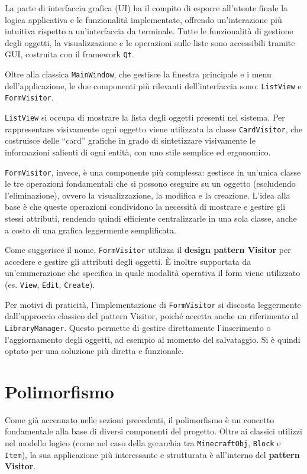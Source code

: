 \documentclass[12pt]{article}
\begin{document}
La parte di interfaccia grafica (UI) ha il compito di esporre all’utente finale la logica applicativa e le funzionalità implementate, offrendo un’interazione più intuitiva rispetto a un’interfaccia da terminale.  
Tutte le funzionalità di gestione degli oggetti, la visualizzazione e le operazioni sulle liste sono accessibili tramite GUI, costruita con il framework \texttt{Qt}.

Oltre alla classica \texttt{MainWindow}, che gestisce la finestra principale e i menu dell'applicazione, le due componenti più rilevanti dell’interfaccia sono: \texttt{ListView} e \texttt{FormVisitor}.

\texttt{ListView} si occupa di mostrare la lista degli oggetti presenti nel sistema.  
Per rappresentare visivamente ogni oggetto viene utilizzata la classe \texttt{CardVisitor}, che costruisce delle “card” grafiche in grado di sintetizzare visivamente le informazioni salienti di ogni entità, con uno stile semplice ed ergonomico.

\texttt{FormVisitor}, invece, è una componente più complessa: gestisce in un’unica classe le tre operazioni fondamentali che si possono eseguire su un oggetto (escludendo l'eliminazione), ovvero la visualizzazione, la modifica e la creazione.  
L’idea alla base è che queste operazioni condividono la necessità di mostrare e gestire gli stessi attributi, rendendo quindi efficiente centralizzarle in una sola classe, anche a costo di una grafica leggermente semplificata.

Come suggerisce il nome, \texttt{FormVisitor} utilizza il \textbf{design pattern Visitor} per accedere e gestire gli attributi degli oggetti.  
È inoltre supportata da un’enumerazione che specifica in quale modalità operativa il form viene utilizzato (es. \texttt{View}, \texttt{Edit}, \texttt{Create}).

Per motivi di praticità, l’implementazione di \texttt{FormVisitor} si discosta leggermente dall’approccio classico del pattern Visitor, poiché accetta anche un riferimento al \texttt{LibraryManager}.  
Questo permette di gestire direttamente l’inserimento o l’aggiornamento degli oggetti, ad esempio al momento del salvataggio. Si è quindi optato per una soluzione più diretta e funzionale.

\section{Polimorfismo}
\label{sec:polimorfismo}

Come già accennato nelle sezioni precedenti, il polimorfismo è un concetto fondamentale alla base di diversi componenti del progetto.  
Oltre ai classici utilizzi nel modello logico (come nel caso della gerarchia tra \texttt{MinecraftObj}, \texttt{Block} e \texttt{Item}), la sua applicazione più interessante e strutturata è all'interno del \textbf{pattern Visitor}.
\end{document}

